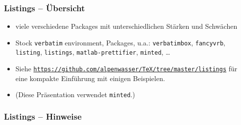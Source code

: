 \documentclass{beamer}                %
\newcommand*\code[1]{\texttt{#1}}
\begin{document}
\begin{frame} %
    \frametitle{Listings -- \"Ubersicht}

    \begin{itemize}
        \item
            viele verschiedene  Packages  mit unterschiedlichen  St\"arken und
            Schw\"achen
        \item
            Stock     \code{verbatim}     environment,     Packages,     u.a.:
            \code{verbatimbox},        \code{fancyvrb},        \code{listing},
            \code{listings}, \code{matlab-prettifier}, \code{minted}, \ldots
        \item
            Siehe
            \href{https://github.com/alpenwasser/TeX/tree/master/listings}
                 {\nolinkurl{https://github.com/alpenwasser/TeX/tree/master/listings}}
            f\"ur eine kompakte Einf\"uhrung mit einigen Beispielen.
        \item
            (Diese Pr\"asentation verwendet \code{minted}.)
    \end{itemize}
\end{frame}
\begin{frame} %
    \frametitle{Listings -- Hinweise}

\end{frame}
\end{document}
